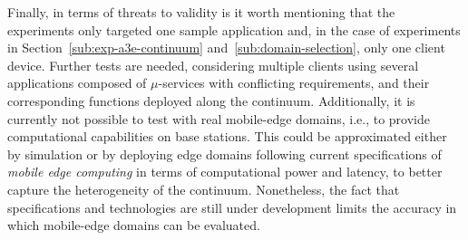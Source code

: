 

Finally, in terms of threats to validity is it worth mentioning that the experiments only targeted one sample application and, in the case of experiments in Section~\ref{sub:exp-a3e-continuum} and~\ref{sub:domain-selection}, only one client device. Further tests are needed, considering multiple clients using several applications composed of $\mu$-services with conflicting requirements, and their corresponding functions deployed along the continuum. Additionally, it is currently not possible to test with real mobile-edge domains, i.e., to provide computational capabilities on base stations. This could be approximated either by simulation or by deploying edge domains following current specifications of \textit{mobile edge computing} in terms of computational power and latency, to better capture the heterogeneity of the continuum. Nonetheless, the fact that specifications and technologies are still under development limits the accuracy in which mobile-edge domains can be evaluated.  %



